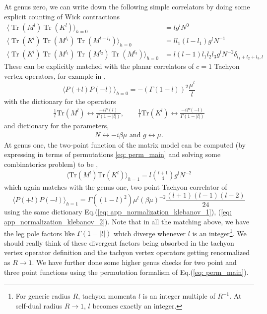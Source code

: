 \documentclass[english]{article}
\DeclareMathOperator{\Tr}{Tr}
\newcommand\be{\begin{equation}}
\newcommand\ee{\end{equation}}
\newcommand{\inv}{\frac{1}}
\renewcommand{\>}{\rangle}
\newcommand{\<}{\langle}
\newcommand{\de}{\delta}
\renewcommand{\(}{\left(}
\renewcommand{\)}{\right)}
\begin{document}
At genus zero, we can write down the following simple correlators by doing some explicit counting of Wick contractions
\be 
\begin{split}
\langle \Tr(M^l) \Tr(K^l) \rangle_{h=0} &= l g^lN^0\\
\langle  \Tr(K^l) \Tr(M^{l_1})\Tr(M^{l-l_1}) \rangle_{h=0} &= ll_1(l-l_1)g^lN^{-1}\\
\langle \Tr(K^{l})\Tr(M^{l_1})\Tr(M^{l_2})\Tr(M^{l_3})\rangle_{h=0} &= l(l-1)l_1 l_2 l_3 g^l N^{-2} \de_{l_1+l_2+l_3, l}  
\end{split}
\ee 
These can be explicitly matched with the planar correlators of $c=1$ Tachyon vertex operators, for example in \cite{klebanov1991string},
\be
\langle P(+l) P(-l) \rangle_{h=0} =  -(\Gamma(1-l))^2\frac{\mu^{l}}{l}
\ee 
with the dictionary for the operators
\begin{align}\label{eq: app_normalization_klebanov_1}
    \inv{l}\text{Tr}(M^l)\leftrightarrow\frac{-iP(l)}{\Gamma(1-|l|)}, \qquad \inv{l}\text{Tr}(K^l)\leftrightarrow\frac{-iP(-l)}{\Gamma(1-|l|)}
\end{align}
and dictionary for the parameters, 
\begin{align}\label{eq: app_normalization_klebanov_2}
    N \leftrightarrow -i \beta\mu \text{ and } g \leftrightarrow \mu.
\end{align}
At genus one, the two-point function of the matrix model can be computed (by expressing in terms of permutations \eqref{eq: perm_main} and solving some combinatorics problem) to be \cite{brown2011complex}, \cite{Brown:2010pb}
\begin{align}
    \langle\text{Tr}(M^l)\text{Tr}(K^l)\rangle_{h=1} = l {{l+1}\choose{4}}g^{l}N^{-2}
\end{align}
which again matches with the genus one, two point Tachyon correlator of \cite{klebanov1991string}
\be 
\langle P(+l) P(-l) \rangle_{h=1} = \Gamma((1-l)^2)\mu^{l}(\beta\mu)^{-2}\frac{(l+1)(l-1)(l-2)}{24}
\ee 
using the same dictionary Eq.(\ref{eq: app_normalization_klebanov_1}), (\ref{eq: app_normalization_klebanov_2}). Note that in all the matching above, we have the leg pole factors like $\Gamma(1-|l|)$ which diverge whenever $l$ is an integer\footnote{ For generic radius $R$, tachyon momenta $l$ is an integer multiple of $R^{-1}$. At self-dual radius $R\rightarrow 1$, $l$ becomes exactly an integer.}. We should really think of these divergent factors being absorbed in the tachyon vertex operator definition and the tachyon vertex operators getting renormalized as $R\rightarrow 1$. We have further done some higher genus checks for two point and three point functions using the permutation formalism of Eq.(\eqref{eq: perm_main}).
\end{document}
